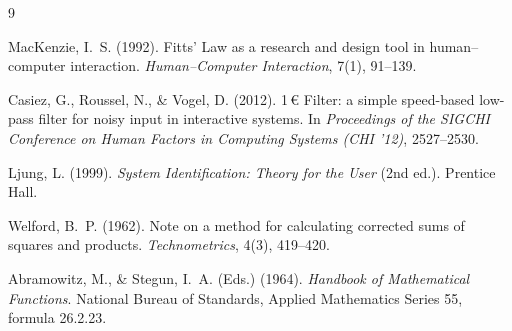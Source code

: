 \documentclass[11pt,a4paper]{article}
\begin{document}
\begin{thebibliography}{9}

MacKenzie, I.~S. (1992). Fitts' Law as a research and design tool in human--computer interaction. \emph{Human--Computer Interaction}, 7(1), 91--139.

Casiez, G., Roussel, N., \& Vogel, D. (2012). 1\,$\euro$ Filter: a simple speed-based low-pass filter for noisy input in interactive systems. In \emph{Proceedings of the SIGCHI Conference on Human Factors in Computing Systems (CHI '12)}, 2527--2530.

Ljung, L. (1999). \emph{System Identification: Theory for the User} (2nd ed.). Prentice Hall.

Welford, B.~P. (1962). Note on a method for calculating corrected sums of squares and products. \emph{Technometrics}, 4(3), 419--420.

Abramowitz, M., \& Stegun, I.~A. (Eds.) (1964). \emph{Handbook of Mathematical Functions}. National Bureau of Standards, Applied Mathematics Series 55, formula 26.2.23.

\end{thebibliography}
\end{document}
